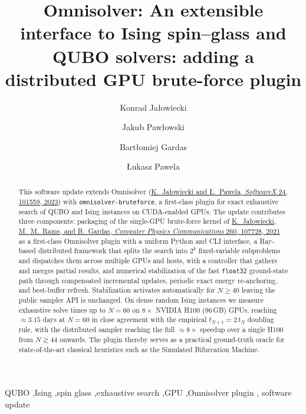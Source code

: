 \documentclass[preprint,12pt,a4paper]{elsarticle}
\begin{document}
\begin{frontmatter}

\title{Omnisolver: An extensible interface to Ising spin--glass and QUBO solvers: adding a distributed GPU brute-force plugin}

\author[1]{Konrad Ja\l{}owiecki}
\author[2,3]{Jakub Paw{\l}owski}
\author[1,2]{Bart{\l}omiej Gardas}
\author[1,2]{{\L}ukasz Pawela}

\address[1]{Institute of Theoretical and Applied Informatics, Polish Academy
of Sciences, Ba{\l}tycka 5, 44-100 Gliwice, Poland}

\address[2]{Quantumz.io Sp. z o. o., Pu{\l}awska 12/3, 02-566 Warsaw, Poland}

\address[3]{Institute of Theoretical Physics, Faculty of Fundamental Problems
of Technology, Wroc{\l}aw University of Science and Technology,
50-370 Wroc{\l}aw, Poland}

\begin{abstract}
This software update extends Omnisolver
(\href{https://doi.org/10.1016/j.softx.2023.101559}{K.~Ja\l{}owiecki and
{\L}.~Pawela, \emph{SoftwareX} 24, 101559, 2023}) with
\texttt{omnisolver-bruteforce}, a first-class plugin for exact exhaustive
search of QUBO and Ising instances on CUDA-enabled GPUs. The update
contributes three components: packaging of the single-GPU brute-force
kernel of \href{https://doi.org/10.1016/j.cpc.2020.107728}{K.~Ja\l{}owiecki,
M.~M.~Rams, and B.~Gardas, \emph{Computer Physics Communications} 260,
107728, 2021} as a first-class Omnisolver plugin with a uniform Python and
CLI interface, a Ray-based distributed framework that splits the search
into $2^{k}$ fixed-variable subproblems and dispatches them across multiple
GPUs and hosts, with a controller that gathers and merges partial results,
and numerical stabilization of the fast \texttt{float32} ground-state
path through compensated incremental updates, periodic exact energy
re-anchoring, and best-buffer refresh. Stabilization activates automatically
for $N \geq 40$ leaving the public sampler API is unchanged. On dense random Ising
instances we measure exhaustive solve times up to $N=60$ on $8\times$ NVIDIA
H100 (96\,GB) GPUs, reaching $\approx\!3.15$ days at $N=60$ in close
agreement with the empirical $t_{N+1}=2\,t_N$ doubling rule, with the
distributed sampler reaching the full $\approx\!8\times$ speedup over a
single H100 from $N\!\gtrsim\!44$ onwards. The plugin thereby serves as a
practical ground-truth oracle for state-of-the-art classical heuristics such
as the Simulated Bifurcation Machine.
\end{abstract}

\begin{keyword}
QUBO \sep Ising \sep spin glass \sep exhaustive search \sep GPU \sep Omnisolver plugin \sep
software update
\end{keyword}

\end{frontmatter}
\end{document}
